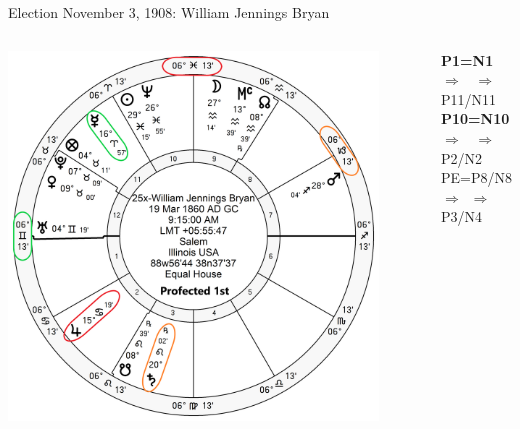 \begin{frame}[t]{Election November 3, 1908: William Jennings Bryan}
\begin{columns}[T, onlytextwidth]
\vspace{-1em}
{\includegraphics[width=0.9\textwidth]{charts/Bryan-Prof-1st.png}}

\textbf{\dgreen P1=N1} 
	$\Rightarrow$ \Mercury\, $\Rightarrow$ P11/N11\\
\textbf{\red P10=N10}
	$\Rightarrow$ \Jupiter\, $\Rightarrow$ P2/N2\\
PE=P8/N8 
	$\Rightarrow$ \Saturn\,\Retrograde $\Rightarrow$ P3/N4


\end{columns}
\end{frame}
